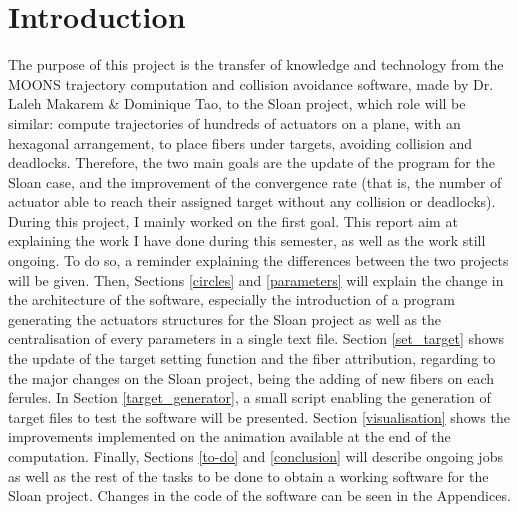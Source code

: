 \section{Introduction} \label{introduction}

The purpose of this project is the transfer of knowledge and technology from the MOONS trajectory computation and collision avoidance software, made by Dr. Laleh Makarem \cite{makarem_a, makarem_b, makarem_c} \& Dominique Tao, to the Sloan project, which role will be similar: compute trajectories of hundreds of actuators on a plane, with an hexagonal arrangement, to place fibers under targets, avoiding collision and deadlocks. Therefore, the two main goals are the update of the program for the Sloan case, and the improvement of the convergence rate (that is, the number of actuator able to reach their assigned target without any collision or deadlocks).
\\

During this project, I mainly worked on the first goal. This report aim at explaining the work I have done during this semester, as well as the work still ongoing. To do so, a reminder explaining the differences between the two projects will be given. Then, Sections \ref{circles} and \ref{parameters} will explain the change in the architecture of the software, especially the introduction of a program generating the actuators structures for the Sloan project as well as the centralisation of every parameters in a single text file. Section \ref{set_target} shows the update of the target setting function and the fiber attribution, regarding to the major changes on the Sloan project, being the adding of new fibers on each ferules. In Section \ref{target_generator}, a small script enabling the generation of target files to test the software will be presented. Section \ref{visualisation} shows the improvements implemented on the animation available at the end of the computation. Finally, Sections \ref{to-do} and \ref{conclusion} will describe ongoing jobs as well as the rest of the tasks to be done to obtain a working software for the Sloan project. Changes in the code of the software can be seen in the Appendices.